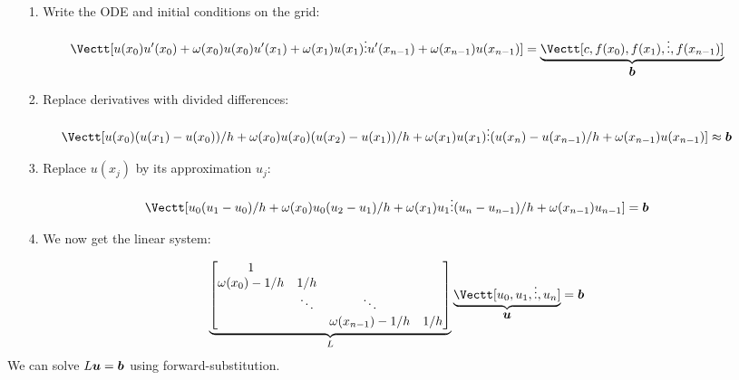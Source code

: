 \begin{itemize}
\item[1. ] Write the ODE and initial conditions on the grid:

\end{itemize}
\[
\Vectt[u(x_0) \\ 
u'(x_0) + \ensuremath{\omega}(x_0) u(x_0) \\
u'(x_1) + \ensuremath{\omega}(x_1) u(x_1) \\
\ensuremath{\vdots} \\
u'(x_{n-1})+ \ensuremath{\omega}(x_{n-1}) u(x_{n-1})] = \underbrace{\Vectt[c, f(x_0), f(x_1), \ensuremath{\vdots} , f(x_{n-1})]}_{\ensuremath{\bm{\b}}}
\]
\begin{itemize}
\item[2. ] Replace derivatives with divided differences:

\end{itemize}
\[
\Vectt[u(x_0) \\ 
(u(x_1) - u(x_0))/h + \ensuremath{\omega}(x_0)u(x_0) \\
(u(x_2) - u(x_1))/h + \ensuremath{\omega}(x_1)u(x_1) \\
\ensuremath{\vdots} \\
(u(x_n) - u(x_{n-1})/h + \ensuremath{\omega}(x_{n-1})u(x_{n-1})] \ensuremath{\approx} \ensuremath{\bm{\b}}
\]
\begin{itemize}
\item[3. ] Replace $u(x_j)$  by its approximation $u_j$:

\end{itemize}
\[
\Vectt[u_0 \\ 
(u_1 - u_0)/h + \ensuremath{\omega}(x_0) u_0 \\
(u_2 - u_1)/h + \ensuremath{\omega}(x_1) u_1 \\
\ensuremath{\vdots} \\
(u_n - u_{n-1})/h  + \ensuremath{\omega}(x_{n-1}) u_{n-1}] = \ensuremath{\bm{\b}}
\]
\begin{itemize}
\item[4. ] We now get the linear system:

\end{itemize}
\[
\underbrace{\begin{bmatrix}
    1 \\ 
    \ensuremath{\omega}(x_0)-1/h & 1/h \\
    & \ensuremath{\ddots} & \ensuremath{\ddots} \\
    && \ensuremath{\omega}(x_{n-1})-1/h & 1/h \end{bmatrix}}_L \underbrace{\Vectt[u_0,u_1,\ensuremath{\vdots},u_n]}_{\ensuremath{\bm{\u}}} = \ensuremath{\bm{\b}}
\]
We can solve $L \bm{{\mbox{\boldmath$u$\unboldmath}}} = \bm{{\mbox{\boldmath$b$\unboldmath}}}$ using forward-substitution.

